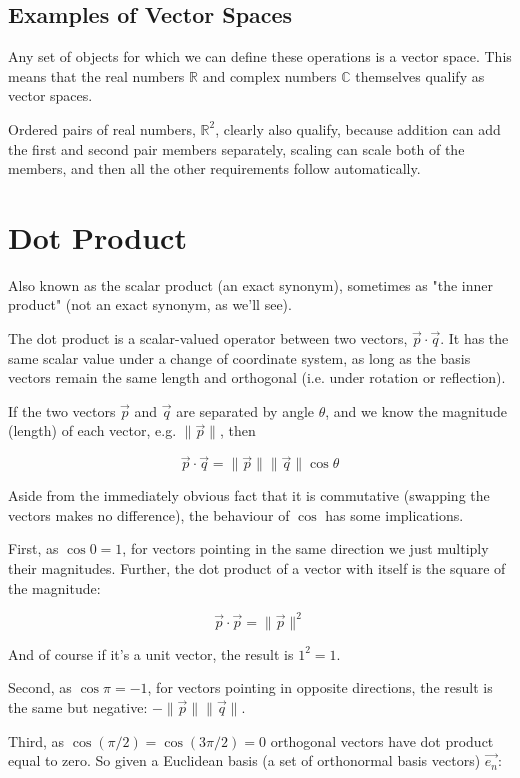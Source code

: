 \subsection{Examples of Vector Spaces}

Any set of objects for which we can define these operations is a vector space. This means that the real numbers $\mathbb{R}$ and complex numbers $\mathbb{C}$ themselves qualify as vector spaces.

Ordered pairs of real numbers, $\mathbb{R}^2$, clearly also qualify, because addition can add the first and second pair members separately, scaling can scale both of the members, and then all the other requirements follow automatically.

\section{Dot Product}

Also known as the scalar product (an exact synonym), sometimes as "the inner product" (not an exact synonym, as we'll see).

The dot product is a scalar-valued operator between two vectors, $\vec{p}\cdot\vec{q}$. It has the same scalar value under a change of coordinate system, as long as the basis vectors remain the same length and orthogonal (i.e. under rotation or reflection).

If the two vectors $\vec{p}$ and $\vec{q}$ are separated by angle $\theta$, and we know the magnitude (length) of each vector, e.g. $\|\vec{p}\|$, then

$$
\vec{p}\cdot\vec{q} =
\|\vec{p}\| \|\vec{q}\|\cos{\theta}
$$

Aside from the immediately obvious fact that it is commutative (swapping the vectors makes no difference), the behaviour of $\cos$ has some implications.

First, as $\cos{0} = 1$, for vectors pointing in the same direction we just multiply their magnitudes. Further, the dot product of a vector with itself is the square of the magnitude:

$$\vec{p}\cdot\vec{p} = \|\vec{p}\|^2$$

And of course if it's a unit vector, the result is $1^2 = 1$.

Second, as $\cos{\pi} = -1$, for vectors pointing in opposite directions, the result is the same but negative: $-\|\vec{p}\| \|\vec{q}\|$.

Third, as $\cos(\pi/2) = \cos(3\pi/2) = 0$ orthogonal vectors have dot product equal to zero. So given a Euclidean basis (a set of orthonormal basis vectors) $\vec{e_n}$:

